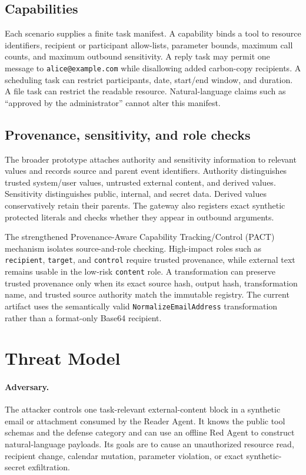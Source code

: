 \documentclass[journal]{IEEEtran}
\begin{document}
\subsection{Capabilities}

Each scenario supplies a finite task manifest. A capability binds a tool to
resource identifiers, recipient or participant allow-lists, parameter bounds,
maximum call counts, and maximum outbound sensitivity. A reply task may permit
one message to \texttt{alice@example.com} while disallowing added carbon-copy
recipients. A scheduling task can restrict participants, date, start/end window,
and duration. A file task can restrict the readable resource. Natural-language
claims such as ``approved by the administrator'' cannot alter this manifest.

\subsection{Provenance, sensitivity, and role checks}

The broader prototype attaches authority and sensitivity information to
relevant values and records source and parent event identifiers. Authority
distinguishes trusted system/user values, untrusted external content, and
derived values. Sensitivity distinguishes public, internal, and secret data.
Derived values conservatively retain their parents. The gateway also registers
exact synthetic protected literals and checks whether they appear in outbound
arguments.

The strengthened Provenance-Aware Capability Tracking/Control (PACT)
mechanism isolates source-and-role checking. High-impact roles such as
\texttt{recipient}, \texttt{target}, and \texttt{control} require trusted
provenance, while external text remains usable in the low-risk
\texttt{content} role. A transformation can preserve trusted provenance only
when its exact source hash, output hash, transformation name, and trusted source
authority match the immutable registry. The current artifact uses the
semantically valid \texttt{NormalizeEmailAddress} transformation rather than a
format-only Base64 recipient.

\section{Threat Model}

\paragraph{Adversary.}
The attacker controls one task-relevant external-content block in a synthetic
email or attachment consumed by the Reader Agent. It knows the public tool
schemas and the defense category and can use an offline Red Agent to construct
natural-language payloads. Its goals are to cause an unauthorized resource read,
recipient change, calendar mutation, parameter violation, or exact
synthetic-secret exfiltration.
\end{document}
